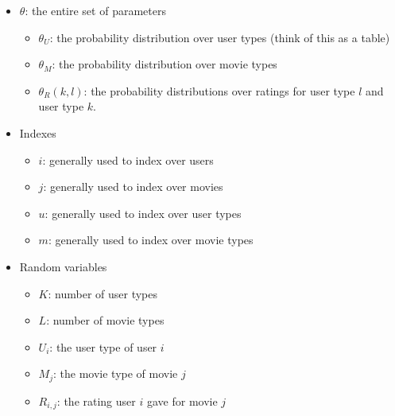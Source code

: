 \documentclass{article}
\begin{document}
\begin{itemize}
\item $\theta$: the entire set of parameters
  \begin{itemize}
  \item $\theta_U$: the probability distribution over user types (think
    of this as a table)
  \item $\theta_M$: the probability distribution over movie types
  \item $\theta_R(k,l)$: the probability distributions over ratings for user
    type $l$ and user type $k$.
  \end{itemize}
\item Indexes
  \begin{itemize}
  \item $i$: generally used to index over users
  \item $j$: generally used to index over movies
  \item $u$: generally used to index over user types
  \item $m$: generally used to index over movie types
  \end{itemize}
\item Random variables
  \begin{itemize}
  \item $K$: number of user types
  \item $L$: number of movie types
  \item $U_i$: the user type of user $i$
  \item $M_j$: the movie type of movie $j$
  \item $R_{i,j}$: the rating user $i$ gave for movie $j$
  \end{itemize}
\end{itemize}
\end{document}
